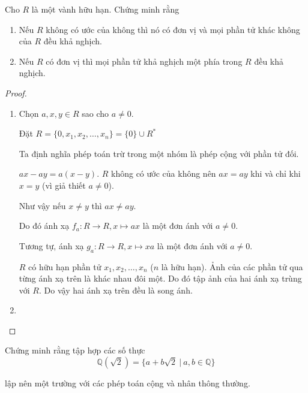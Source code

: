 \documentclass[class=linearalgebra,crop=false]{standalone}
\begin{document}
\begin{exercise}Cho $R$ là một vành hữu hạn. Chứng minh rằng
    \begin{enumerate}[label = (\alph*)]
        \item Nếu $R$ không có ước của không thì nó có đơn vị và mọi phần tử khác không của $R$ đều khả nghịch.
        \item Nếu $R$ có đơn vị thì mọi phần tử khả nghịch một phía trong $R$ đều khả nghịch.
    \end{enumerate}
\end{exercise}

\begin{proof}
    \begin{enumerate}[label = (\alph*)]
        \item Chọn $a, x, y \in R$ sao cho $a\ne 0$.
        \par Đặt $R = \{ 0, x_{1}, x_{2}, \ldots, x_{n} \} = \{ 0 \} \cup R^{*}$
        \par Ta định nghĩa phép toán trừ trong một nhóm là phép cộng với phần tử đối.
        \par $ax - ay = a(x - y)$. $R$ không có ước của không nên $ax = ay$ khi và chỉ khi $x = y$ (vì giả thiết $a\ne 0$).
        \par Như vậy nếu $x\ne y$ thì $ax \ne ay$.
        \par Do đó ánh xạ $f_{a}: R\rightarrow R, x\mapsto ax$ là một đơn ánh với $a\ne 0$.
        \par Tương tự, ánh xạ $g_{a}: R\rightarrow R, x\mapsto xa$ là một đơn ánh với $a\ne 0$.
        \par $R$ có hữu hạn phần tử $x_{1}, x_{2}, \ldots, x_{n}$ ($n$ là hữu hạn). Ảnh của các phần tử qua từng ánh xạ trên là khác nhau đôi một. Do đó tập ảnh của hai ánh xạ trùng với $R$. Do vậy hai ánh xạ trên đều là song ánh.

        \item
    \end{enumerate}
\end{proof}

\begin{exercise}Chứng minh rằng tập hợp các số thực
    \[ \mathbb{Q}(\sqrt{2}) = \{ a + b\sqrt{2}\ |\ a, b\in\mathbb{Q} \} \]
    \par lập nên một trường với các phép toán cộng và nhân thông thường.
\end{exercise}
\end{document}
